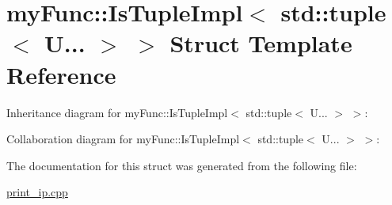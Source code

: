 \hypertarget{structmyFunc_1_1IsTupleImpl_3_01std_1_1tuple_3_01U_8_8_8_01_4_01_4}{}\section{my\+Func\+:\+:Is\+Tuple\+Impl$<$ std\+:\+:tuple$<$ U... $>$ $>$ Struct Template Reference}
\label{structmyFunc_1_1IsTupleImpl_3_01std_1_1tuple_3_01U_8_8_8_01_4_01_4}


Inheritance diagram for my\+Func\+:\+:Is\+Tuple\+Impl$<$ std\+:\+:tuple$<$ U... $>$ $>$\+:


Collaboration diagram for my\+Func\+:\+:Is\+Tuple\+Impl$<$ std\+:\+:tuple$<$ U... $>$ $>$\+:


The documentation for this struct was generated from the following file\+:\begin{DoxyCompactItemize}
\item 
\hyperlink{print__ip_8cpp}{print\+\_\+ip.\+cpp}\end{DoxyCompactItemize}
